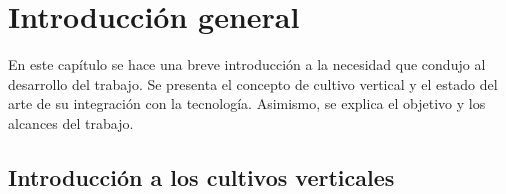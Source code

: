 
\chapter{Introducción general} %

\label{Chapter1} %
\label{IntroGeneral}

En este capítulo se hace una breve introducción a la necesidad que condujo al
desarrollo del trabajo. Se presenta el concepto de cultivo vertical y el estado del arte de su integración con la tecnología. Asimismo, se explica el objetivo y los alcances del trabajo.


\newcommand{\keyword}[1]{\textbf{#1}}
\newcommand{\tabhead}[1]{\textbf{#1}}
\newcommand{\code}[1]{\texttt{#1}}
\newcommand{\file}[1]{\texttt{\bfseries#1}}
\newcommand{\option}[1]{\texttt{\itshape#1}}
\newcommand{\grados}{$^{\circ}$}



\section{Introducción a los cultivos verticales}


